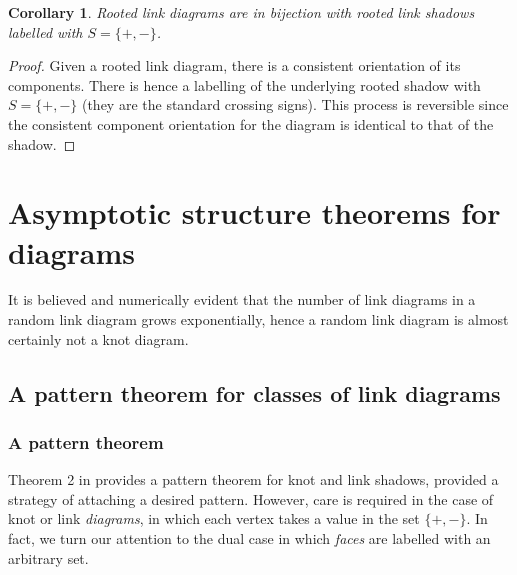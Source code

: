 \documentclass[amsmath,longbibliography,secnumarabic,floatfix,amssymb,nofootinbib,nobibnotes,letterpaper,11pt,notitlepage,tightenlines]{revtex4-1}
\newtheorem{corollary}[theorem]{Corollary}
\begin{document}
\begin{corollary}
  Rooted link diagrams are in bijection with rooted link shadows
  labelled with $S = \{+, -\}$.
  \label{cor:linkdiaaresshadows}
\end{corollary}

\begin{proof}
  Given a rooted link diagram, there is a consistent orientation of
  its components. There is hence a labelling of the underlying rooted
  shadow with $S = \{+, -\}$ (they are the standard crossing signs). This
  process is reversible since the consistent component orientation for
  the diagram is identical to that of the shadow.
\end{proof}

\section{Asymptotic structure theorems for diagrams}
\label{sec:structure}

It is believed and numerically evident \cite{PZJasympconj2004} that the number of link diagrams in a
random link diagram grows exponentially, hence a random link diagram is almost certainly not a knot
diagram.

\subsection{A pattern theorem for classes of link diagrams}
\label{sec:patternthm}

\newcommand{\MapClass}{\mathscr{M}}

\subsubsection{A pattern theorem}
\label{sec:weakpatternthm}

Theorem 2 in \cite{Bender1992104} provides a pattern theorem for knot and link shadows, provided a
strategy of attaching a desired pattern. However, care is required in the case of knot or link
\emph{diagrams}, in which each vertex takes a value in the set $\{+, -\}$. In fact, we turn our
attention to the dual case in which \emph{faces} are labelled with an arbitrary set.
\end{document}
